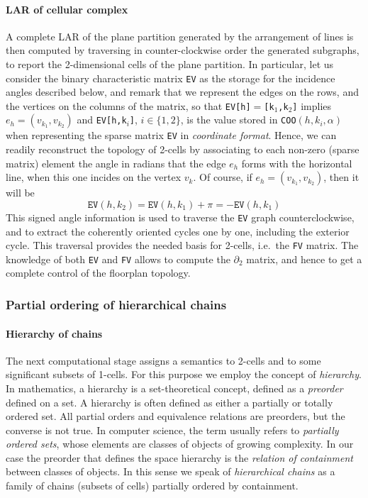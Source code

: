 \documentclass[]{egpubl}
\begin{document}
\paragraph*{LAR of cellular
complex}\label{reconstruction-of-lar-of-the-cellular-complex}

A complete LAR of the plane partition generated by the arrangement of
lines is then computed by traversing in
counter-clockwise order the generated subgraphs, to report the
2-dimensional cells of the plane partition.
In particular, let us consider the binary characteristic matrix \texttt{EV} as the storage for the incidence angles described below, and remark that we represent the edges on the
rows, and the vertices on the columns of the matrix, so that \texttt{EV[h]$=$[k$_1$,k$_2$]} implies $e_h = (v_{k_1},v_{k_2})$ 
and \texttt{EV[h,k$_i$]}, $i\in\{1,2\}$, is the value stored in 
\texttt{COO$(h,k_i,\alpha)$} when representing the sparse matrix \texttt{EV} in \emph{coordinate format}. 
Hence, we can readily reconstruct the topology of 2-cells by
associating to each non-zero (sparse matrix) element
the angle in radians that the edge $e_h$ forms
with the horizontal line, when this one incides on the vertex $v_k$.
Of course, if $e_h = (v_{k_1},v_{k_2})$, then it will be 
\[
\texttt{EV}(h,k_2) = \texttt{EV}(h,k_1)+\pi = -\texttt{EV}(h,k_1)
\]
This signed angle information is used to traverse the \texttt{EV} graph counterclockwise, and to extract the coherently oriented cycles one by one,
including the exterior cycle. This traversal provides the needed basis for 2-cells, i.e.~the \texttt{FV} matrix. The knowledge of both \texttt{EV} and \texttt{FV} allows to compute the $\partial_2$ matrix, and hence to get a complete control of the floorplan topology.

\subsubsection*{Partial ordering of hierarchical chains}

\paragraph*{Hierarchy of chains}

The next computational stage assigns a semantics to 2-cells and to some significant subsets of 1-cells. For this purpose we employ the concept of \emph{hierarchy}.
In mathematics, a hierarchy is a set-theoretical concept, defined as a \emph{preorder} defined on a set. A hierarchy is often defined as either a partially or totally ordered set. All partial orders and equivalence relations are preorders, but the converse is not true. 
In computer science, the term usually refers to \emph{partially ordered sets}, whose elements are classes of objects of growing complexity. In our case the preorder that defines the space hierarchy is the \emph{relation of containment} between classes of objects. In this sense we speak of \emph{hierarchical chains} as a family of chains (subsets of cells) partially ordered by containment.
\end{document}
